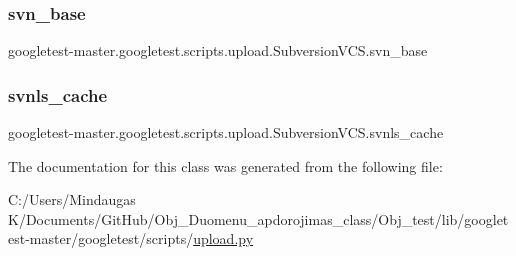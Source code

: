 \subsubsection{\texorpdfstring{svn\_base}{svn\_base}}
{\footnotesize\ttfamily googletest-\/master.\+googletest.\+scripts.\+upload.\+Subversion\+V\+C\+S.\+svn\+\_\+base}

\mbox{\label{classgoogletest-master_1_1googletest_1_1scripts_1_1upload_1_1_subversion_v_c_s_a0669021ce91a16987475e27af8586b70}} 
\subsubsection{\texorpdfstring{svnls\_cache}{svnls\_cache}}
{\footnotesize\ttfamily googletest-\/master.\+googletest.\+scripts.\+upload.\+Subversion\+V\+C\+S.\+svnls\+\_\+cache}



The documentation for this class was generated from the following file\+:\begin{DoxyCompactItemize}
\item 
C\+:/\+Users/\+Mindaugas K/\+Documents/\+Git\+Hub/\+Obj\+\_\+\+Duomenu\+\_\+apdorojimas\+\_\+class/\+Obj\+\_\+test/lib/googletest-\/master/googletest/scripts/\mbox{\hyperlink{_obj__test_2lib_2googletest-master_2googletest_2scripts_2upload_8py}{upload.\+py}}\end{DoxyCompactItemize}
